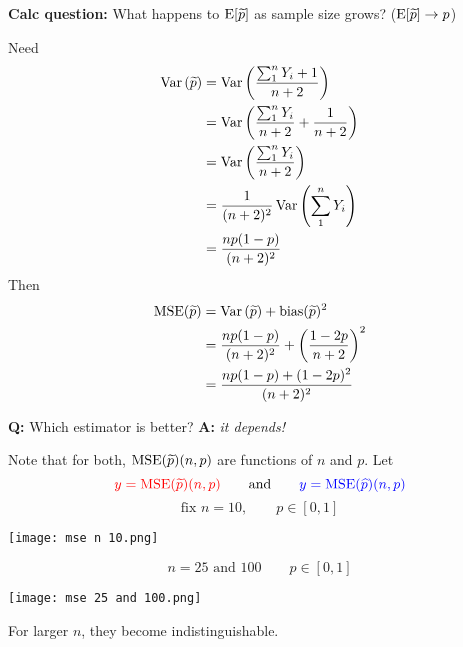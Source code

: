 \nnl\textbf{Calc question:} What happens to $\Eb*{\ptilde}$ as sample size grows? ($\Eb*{\ptilde} \to p$)

\nnl Need
\begin{align*}
    \Var{\ptilde} &= \Var{\frac{\sum_1^n Y_i + 1}{n+2}} \\
    &=  \Var{\frac{\sum_1^n Y_i}{n+2} + \over{n+2}} \\
    &= \Var{\frac{\sum_1^n Y_i}{n+2}} \\
    &= \over{(n+2)^2} \Var{\sum_1^n Y_i} \\
    &= \frac{np(1-p)}{(n+2)^2}
\end{align*}
Then
\begin{align*}
    \MSE*{\ptilde} &= \Var{\ptilde} + \bias*{\ptilde}^2\\
    &= \frac{np(1-p)}{(n+2)^2} + \pars{\frac{1-2p}{n+2}}^2\\
    &= \frac{np(1-p) + (1-2p)^2}{(n+2)^2}
\end{align*}


\nl \textbf{Q:} Which estimator is better? \hspace{0.25in} \textbf{A:} \textit{it depends!}

\nnl Note that for both, $\MSE*{\ptilde}(n,p)$ are functions of $n$ and $p$. Let
$$\red{y=\MSE*{\ptilde}(n,p)} \wideand \blue{y=\MSE*{\phat}(n,p)}$$
\newpage
$$\text{fix } n = 10, \qquad p \in[0,1]$$
\begin{center}\texttt{[image: mse n 10.png]}\end{center}

$$n = 25 \text{ and } 100 \qquad p \in [0,1]$$
\begin{center}\texttt{[image: mse 25 and 100.png]}\end{center}
For larger $n$, they become indistinguishable.